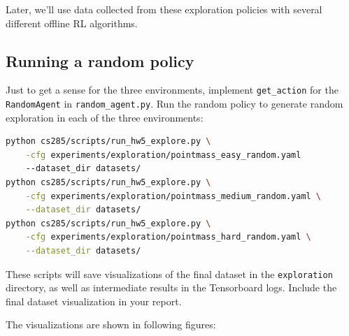\documentclass{article}
\begin{document}
Later, we'll use data collected from these exploration policies with several different offline RL algorithms.

\subsection{Running a random policy}
Just to get a sense for the three environments, implement \verb+get_action+ for the \verb+RandomAgent+ in \verb+random_agent.py+. Run the random policy to generate random exploration in each of the three environments:
\begin{lstlisting}[language=bash]
python cs285/scripts/run_hw5_explore.py \
    -cfg experiments/exploration/pointmass_easy_random.yaml
    --dataset_dir datasets/
python cs285/scripts/run_hw5_explore.py \
    -cfg experiments/exploration/pointmass_medium_random.yaml \
    --dataset_dir datasets/
python cs285/scripts/run_hw5_explore.py \
    -cfg experiments/exploration/pointmass_hard_random.yaml \
    --dataset_dir datasets/
\end{lstlisting}
These scripts will save visualizations of the final dataset in the \verb+exploration+ directory, as well as intermediate results in the Tensorboard logs. Include the final dataset visualization in your report.

\MYSOLUTION The visualizations are shown in following figures:

\end{document}
